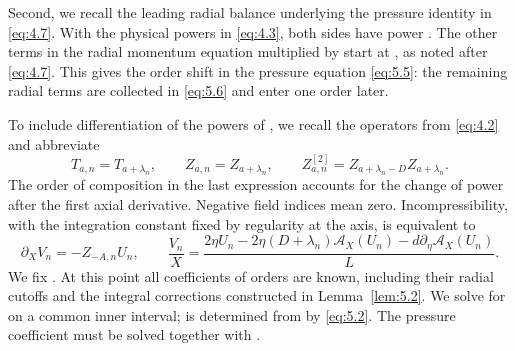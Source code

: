 Second, we recall the leading radial balance
 underlying the
pressure identity in \eqref{eq:4.7}. With the physical powers in
\eqref{eq:4.3}, both sides have power . The other
terms in the radial momentum equation multiplied by 
start at , as noted after
\eqref{eq:4.7}. This gives the order shift in the pressure equation
\eqref{eq:5.5}: the remaining radial terms are collected in \eqref{eq:5.6} and
enter one order later.

To include differentiation of the powers of , we recall
the operators  from \eqref{eq:4.2} and abbreviate
\[
T_{a,n}=T_{a+\lambda_n},
\qquad Z_{a,n}=Z_{a+\lambda_n},
\qquad Z_{a,n}^{[2]}=Z_{a+\lambda_n-D}Z_{a+\lambda_n}.
\]
The order of composition in the last expression accounts for the change of
power after the first axial derivative. Negative field indices mean zero.
Incompressibility, with the integration constant fixed by regularity at the
axis, is equivalent to
\begin{equation}
\label{eq:5.2}
\partial_XV_n=-Z_{-A,n}U_n,
\qquad
\frac{V_n}{X}
=\frac{2\eta U_n-2\eta(D+\lambda_n)\mathcal A_X(U_n)
-d\partial_\eta\mathcal A_X(U_n)}{L}.
\tag{5.2}
\end{equation}
We fix . At this point all coefficients of orders
 are known, including their radial cutoffs and the
integral corrections constructed in Lemma~\ref{lem:5.2}. We solve for
 on a common inner interval;
 is determined from  by
\eqref{eq:5.2}. The pressure coefficient  must be
solved together with .

